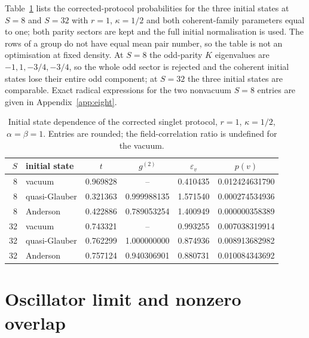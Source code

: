 \documentclass[11pt,a4paper]{article}
\begin{document}
Table~\ref{tab:initial} lists the corrected-protocol probabilities for the three initial states at $S=8$ and $S=32$ with $r=1$, $\kappa=1/2$ and both coherent-family parameters equal to one; both parity sectors are kept and the full initial normalisation is used. The rows of a group do not have equal mean pair number, so the table is not an optimisation at fixed density. At $S=8$ the odd-parity $K$ eigenvalues are $-1,1,-3/4,-3/4$, so the whole odd sector is rejected and the coherent initial states lose their entire odd component; at $S=32$ the three initial states are comparable. Exact radical expressions for the two nonvacuum $S=8$ entries are given in Appendix~\ref{app:eight}.

\begin{table}[t]
\centering
\small
\begin{tabular}{rlcccc}
\toprule
$S$ & initial state & $t$ & $g^{(2)}$ & $\varepsilon_v$ & $p(v)$\\
\midrule
8 & vacuum & 0.969828 & -- & 0.410435 & 0.012424631790\\
8 & quasi-Glauber & 0.321363 & 0.999988135 & 1.571540 & 0.000274534936\\
8 & Anderson & 0.422886 & 0.789053254 & 1.400949 & 0.000000358389\\
32 & vacuum & 0.743321 & -- & 0.993255 & 0.007038319914\\
32 & quasi-Glauber & 0.762299 & 1.000000000 & 0.874936 & 0.008913682982\\
32 & Anderson & 0.757124 & 0.940306901 & 0.880731 & 0.010084343692\\
\bottomrule
\end{tabular}
\caption{Initial state dependence of the corrected singlet protocol, $r=1$, $\kappa=1/2$, $\alpha=\beta=1$. Entries are rounded; the field-correlation ratio is undefined for the vacuum.}
\label{tab:initial}
\end{table}

\section{Oscillator limit and nonzero overlap}
\label{sec:limit}
\end{document}
